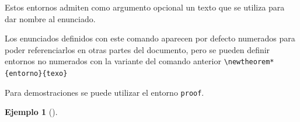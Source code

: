 \documentclass[
  spanish,
  a4paper,
]{scrreport}
\newenvironment{Shaded}{\begin{snugshade}}{\end{snugshade}}
\newcommand{\BuiltInTok}[1]{\textcolor[rgb]{0.00,0.23,0.31}{#1}}
\newcommand{\CommentTok}[1]{\textcolor[rgb]{0.37,0.37,0.37}{#1}}
\newcommand{\ExtensionTok}[1]{\textcolor[rgb]{0.00,0.23,0.31}{#1}}
\newcommand{\FunctionTok}[1]{\textcolor[rgb]{0.28,0.35,0.67}{#1}}
\newcommand{\KeywordTok}[1]{\textcolor[rgb]{0.00,0.23,0.31}{\textbf{#1}}}
\newcommand{\NormalTok}[1]{\textcolor[rgb]{0.00,0.23,0.31}{#1}}
\newcommand{\SpecialCharTok}[1]{\textcolor[rgb]{0.37,0.37,0.37}{#1}}
\newcommand{\SpecialStringTok}[1]{\textcolor[rgb]{0.13,0.47,0.30}{#1}}
\theoremstyle{definition}
\newtheorem{example}{Ejemplo}[chapter]
\theoremstyle{remark}
\begin{document}
Estos entornos admiten como argumento opcional un texto que se utiliza
para dar nombre al enunciado.

Los enunciados definidos con este comando aparecen por defecto numerados
para poder referenciarlos en otras partes del documento, pero se pueden
definir entornos no numerados con la variante del comando anterior
\texttt{\textbackslash{}newtheorem*\{entorno\}\{texo\}}

Para demostraciones se puede utilizar el entorno \texttt{proof}.

\begin{example}[]\protect\hypertarget{exm-teoremas}{}\label{exm-teoremas}

~

\begin{Shaded}
\end{Shaded}
\end{example}
\end{document}
